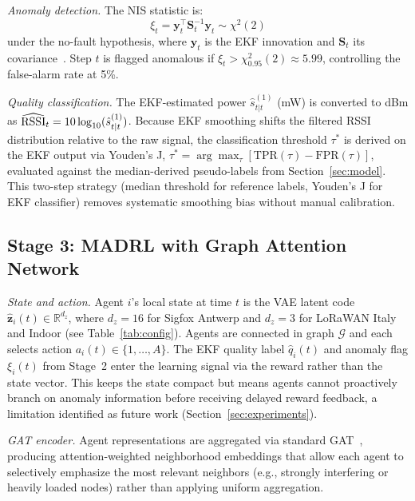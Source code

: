 \documentclass[conference]{IEEEtran}
\begin{document}
\textit{Anomaly detection.}
The NIS statistic is:
\begin{equation}
\xi_t = \mathbf{y}_t^\top \mathbf{S}_t^{-1} \mathbf{y}_t \sim \chi^2(2)
\label{eq:nis}
\end{equation}
under the no-fault hypothesis, where $\mathbf{y}_t$ is the EKF innovation
and $\mathbf{S}_t$ its covariance~\cite{ref_ekf}. Step $t$ is flagged
anomalous if $\xi_t > \chi^2_{0.95}(2) \approx 5.99$, controlling the
false-alarm rate at 5\%.

\textit{Quality classification.}
The EKF-estimated power $\hat{s}^{(1)}_{t|t}$ (mW) is converted to dBm
as $\widehat{\rm RSSI}_{t}=10\log_{10}(\hat{s}^{(1)}_{t|t})$.
Because EKF smoothing shifts the filtered RSSI distribution relative to
the raw signal, the classification threshold $\tau^*$ is derived on the
EKF output via Youden's J, $\tau^*=\arg\max_\tau[\mathrm{TPR}(\tau)-\mathrm{FPR}(\tau)]$,
evaluated against the median-derived pseudo-labels from
Section~\ref{sec:model}. This two-step strategy (median threshold for
reference labels, Youden's J for EKF classifier) removes systematic
smoothing bias without manual calibration.

\subsection{Stage 3: MADRL with Graph Attention Network}

\textit{State and action.}
Agent $i$'s local state at time $t$ is the VAE latent code
$\hat{\mathbf{z}}_i(t)\in\mathbb{R}^{d_z}$, where $d_z=16$ for
Sigfox Antwerp and $d_z=3$ for LoRaWAN Italy and Indoor
(see Table~\ref{tab:config}). Agents are connected in
graph $\mathcal{G}$ and each selects action $a_i(t)\in\{1,\ldots,A\}$.
The EKF quality label $\hat{q}_i(t)$ and anomaly flag $\xi_i(t)$ from
Stage~2 enter the learning signal via the reward rather than the state
vector. This keeps the state compact but means agents cannot proactively
branch on anomaly information before receiving delayed reward feedback,
a limitation identified as future work (Section~\ref{sec:experiments}).

\textit{GAT encoder.}
Agent representations are aggregated via standard GAT~\cite{ref_gat_comm},
producing attention-weighted neighborhood embeddings that allow each agent
to selectively emphasize the most relevant neighbors (e.g., strongly
interfering or heavily loaded nodes) rather than applying uniform aggregation.
\end{document}
